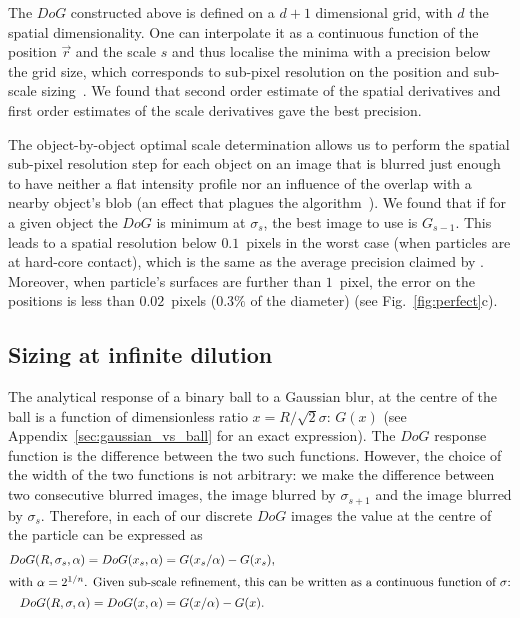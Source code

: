 \documentclass[8.5pt,twoside,twocolumn]{article}
\begin{document}
The $DoG$ constructed above is defined on a $d+1$ dimensional grid, with $d$ the spatial dimensionality. One can interpolate it as a continuous function of the position $\vec{r}$ and the scale $s$ and thus localise the minima with a precision below the grid size, which corresponds to sub-pixel resolution on the position and sub-scale sizing~\citep{Lowe2004}. We found that second order estimate of the spatial derivatives and first order estimates of the scale derivatives gave the best precision.

The object-by-object optimal scale determination allows us to perform the spatial sub-pixel resolution step for each object on an image that is blurred just enough to have neither a flat intensity profile nor an influence of the overlap with a nearby object's blob (an effect that plagues the \citet{Crocker1996} algorithm~\cite{Jenkins2008}). We found that if for a given object the $DoG$ is minimum at $\sigma_s$, the best image to use is $G_{s-1}$. This leads to a spatial resolution below $0.1$~pixels in the worst case (when particles are at hard-core contact), which is the same as the average precision claimed by \citet{Crocker1996}. Moreover, when particle's surfaces are further than $1$~pixel, the error on the positions is less than $0.02$~pixels ($0.3\%$ of the diameter) (see Fig.~\ref{fig:perfect}c).

\subsection{Sizing at infinite dilution}
\label{sec:dilute}
The analytical response of a binary ball to a Gaussian blur, at the centre of the ball is a function of dimensionless ratio $x=R/\sqrt{2}\sigma$: $G(x)$ (see Appendix~\ref{sec:gaussian_vs_ball} for an exact expression). The $DoG$ response function is the difference between the two such functions. However, the choice of the width of the two functions is not arbitrary: we make the difference between two consecutive blurred images, the image blurred by $\sigma_{s+1}$ and the image blurred by $\sigma_s$. Therefore, in each of our discrete $DoG$ images the value at the centre of the particle can be expressed as
\begin{align}
DoG(R,\sigma_s, \alpha) = DoG(x_s, \alpha) &= G(x_s/\alpha) - G(x_s),\\
\intertext{with $\alpha=2^{1/n}$. Given sub-scale refinement, this can be written as a continuous function of $\sigma$:}
DoG(R,\sigma, \alpha) = DoG(x, \alpha) &= G(x/\alpha) - G(x).
\end{align}
\end{document}
